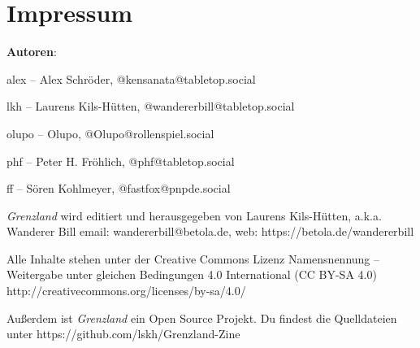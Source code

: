 \documentclass[11pt]{wbzine}
\begin{document}




\begin{multicols}{2}




\end{multicols}

\section{Impressum}

\textbf{Autoren}:

alex -- Alex Schröder, @kensanata@tabletop.social

lkh -- Laurens Kils-Hütten, @wandererbill@tabletop.social

olupo -- Olupo, @Olupo@rollenspiel.social

phf -- Peter H. Fröhlich, @phf@tabletop.social

ff -- Sören Kohlmeyer, @fastfox@pnpde.social

\textit{Grenzland} wird editiert und
herausgegeben von Laurens Kils-Hütten,
a.k.a. Wanderer Bill
email: wandererbill@betola.de, web: https://betola.de/wandererbill

Alle Inhalte stehen unter der Creative Commons Lizenz
Namensnennung -- Weitergabe unter gleichen Bedingungen 4.0 International (CC BY-SA 4.0)\\
http://creativecommons.org/licenses/by-sa/4.0/

Außerdem ist \textit{Grenzland} ein Open Source Projekt. Du
findest die Quelldateien unter
https://github.com/lskh/Grenzland-Zine

\end{document}
